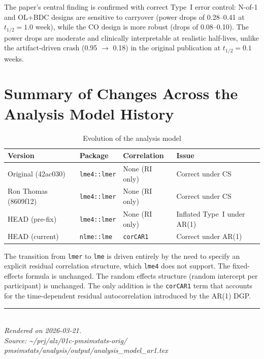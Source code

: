 \documentclass[11pt]{article}
\begin{document}
The paper's central finding is confirmed with correct Type~I
error control: N-of-1 and OL+BDC designs are sensitive to
carryover (power drops of 0.28--0.41 at $t_{1/2} = 1.0$
week), while the CO design is more robust (drops of
0.08--0.10). The power drops are moderate and clinically
interpretable at realistic half-lives, unlike the
artifact-driven crash (0.95 $\to$ 0.18) in the original
publication at $t_{1/2} = 0.1$ weeks.

\section{Summary of Changes Across the Analysis Model History}

\begin{table}[h]
\centering
\caption{Evolution of the analysis model}
\small
\begin{tabular}{llll}
\toprule
Version & Package & Correlation & Issue \\
\midrule
Original (42ac030) & \texttt{lme4::lmer} & None (RI only) &
  Correct under CS \\
Ron Thomas (8609f12) & \texttt{lme4::lmer} & None (RI only) &
  Correct under CS \\
HEAD (pre-fix) & \texttt{lme4::lmer} & None (RI only) &
  Inflated Type~I under AR(1) \\
HEAD (current) & \texttt{nlme::lme} & \texttt{corCAR1} &
  Correct under AR(1) \\
\bottomrule
\end{tabular}
\end{table}

The transition from \texttt{lmer} to \texttt{lme} is driven
entirely by the need to specify an explicit residual
correlation structure, which \texttt{lme4} does not support.
The fixed-effects formula is unchanged. The random effects
structure (random intercept per participant) is unchanged.
The only addition is the \texttt{corCAR1} term that accounts
for the time-dependent residual autocorrelation introduced by
the AR(1) DGP.

\vfill
\noindent\rule{\textwidth}{0.4pt}\\
{\small\textit{Rendered on 2026-03-21.}\\
\textit{Source: \textasciitilde/prj/alz/01c-pmsimstats-orig/%
pmsimstats/analysis/output/analysis\_model\_ar1.tex}}
\end{document}
